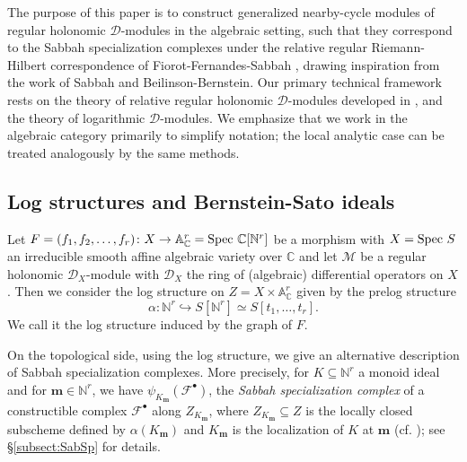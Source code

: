 \documentclass{amsart}
\theoremstyle{plain}
\numberwithin{theorem}{section}
\theoremstyle{definition}
\theoremstyle{remark}
\theoremstyle{definition}
\newcommand{\A}{\mathbb{A}}
\newcommand{\C}{\mathbb{C}} %
\newcommand{\N}{\mathbb{N}}
\newcommand{\cF}{\mathcal{F}}
\newcommand{\cM}{\mathcal{M}}
\newcommand{\bm}{\mathbf{m}}
\newcommand{\shD}{\mathscr{D}}
\newcommand{\Spec}{\textup{Spec }}
\begin{document}
The purpose of this paper is to construct generalized nearby-cycle modules of regular holonomic $\shD$-modules in the algebraic setting, such that they correspond to the Sabbah specialization complexes under the relative regular Riemann-Hilbert correspondence of Fiorot-Fernandes-Sabbah \cite{FFS23}, drawing inspiration from the work of Sabbah and Beilinson-Bernstein. Our primary technical framework rests on
the theory of relative regular holonomic $\shD$-modules developed in 
\cite{FS13, FTM18, FS17, FFS19, FFS23}, and the theory of logarithmic $\shD$-modules. We emphasize that we work in the algebraic category primarily to simplify notation; the local analytic case can be treated analogously by the same methods.

\subsection{Log structures and Bernstein-Sato ideals}
Let $F=(f_1,f_2,\dots,f_r)\colon X\to \A_\C^r=\Spec \C[\N^r]$ be a morphism with $X=\Spec S$ an irreducible smooth affine algebraic variety over $\C$ and let $\cM$ be a regular holonomic $\shD_X$-module with $\shD_X$ the ring of (algebraic) differential operators on $X$. Then we consider the log structure on $Z=X\times \A_\C^r$ given by the prelog structure 
\[\alpha\colon\N^r\hookrightarrow S[\N^r]\simeq S[t_1,\dots,t_r].\]
We call it the log structure induced by the graph of $F$.

On the topological side, using the log structure, we give an alternative description of Sabbah specialization complexes. More precisely, for $K\subseteq \N^r$ a monoid ideal and for $\bm \in \N^r$, we have $\psi_{K_\bm}(\cF^\bullet)$, the \emph{Sabbah specialization complex} of a constructible complex $\cF^\bullet$ along $Z_{K_\bm}$, where $Z_{K_\bm}\subseteq Z$ is the locally closed subscheme defined by $\alpha(K_\bm)$ and $K_\bm$ is the localization of $K$ at $\bm$ (cf. \cite[I.1.4]{Ogusbook}); see \S\ref{subsect:SabSp} for details. 
\end{document}
